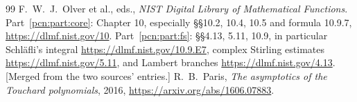 \documentclass[11pt,letterpaper]{article}
\theoremstyle{remark}\newtheorem{remark}[theorem]{Remark}
\begin{document}
\begin{thebibliography}{99}
 F.\ W.\ J.\ Olver et al., eds., \emph{NIST Digital Library of Mathematical Functions}. Part~\ref{pcn:part:core}: Chapter 10, especially \S\S10.2, 10.4, 10.5 and formula 10.9.7, \url{https://dlmf.nist.gov/10}. Part~\ref{pcn:part:fs}: \S\S4.13, 5.11, 10.9, in particular Schl\"afli's integral \url{https://dlmf.nist.gov/10.9.E7}, complex Stirling estimates \url{https://dlmf.nist.gov/5.11}, and Lambert branches \url{https://dlmf.nist.gov/4.13}. [Merged from the two sources' entries.]
 R.\ B.\ Paris, \emph{The asymptotics of the Touchard polynomials}, 2016, \url{https://arxiv.org/abs/1606.07883}.
\end{thebibliography}
\endgroup
\end{document}
